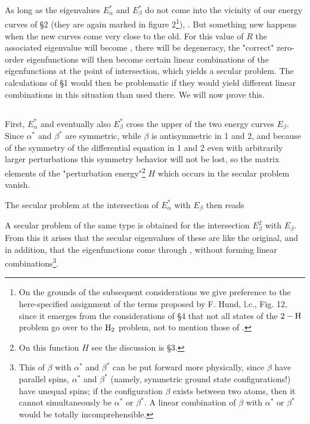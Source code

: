 \begin{paper}{1}
As long as the eigenvalues $E_\alpha^*$ and $E_\beta^*$ do not come into the vicinity of our energy curves of \S2 (they are again marked in figure 2\footnote{On the grounds of the subsequent considerations we give preference to the here-specified assignment of the terms proposed by F. Hund, l.c., Fig. 12, since it emerges from the considerations of \S4 that not all states of the $2-\text{H}$ problem go over to the $\text{H}_2$ problem, not to mention those of \He.}), . But something new happens when the new curves come very close to the old. For this value of $R$ the associated eigenvalue will become , there will be degeneracy, the "correct" zero-order eigenfunctions will then become certain linear combinations of the eigenfunctions at the point of intersection, which yields a secular problem. The calculations of \S1 would then be problematic if they would yield different linear combinations in this situation than used there. We will now prove this.

\subsection{} First, $E_\alpha^*$ and eventually also $E_\beta^*$ cross the upper of the two energy curves $E_\beta$. Since $\alpha^*$ and $\beta^*$ are symmetric, while $\beta$ is antisymmetric in 1 and 2, and because of the symmetry of the differential equation in 1 and 2 even with arbitrarily larger perturbations this symmetry behavior will not be lost, so the matrix elements of the "perturbation energy"\footnote{On this function $H$ see the discussion is \S3.} $H$ which occurs in the secular problem
vanish.

The secular problem at the intersection of $E_\alpha^*$ with $E_\beta$ then reads

A secular problem of the same type is obtained for the intersection $E_\beta^2$ with $E_\beta$. From this it arises that the secular eigenvalues of these are like the original, and in addition, that the eigenfunctions come through , without forming linear combinations\footnote{This  of $\beta$ with $\alpha^*$ and $\beta^*$ can be put forward more physically, since $\beta$ have parallel spins, $\alpha^*$ and $\beta^*$ (namely, symmetric \He ground state configurations!) have unequal spins; if the configuration $\beta$ exists between two atoms, then it cannot simultaneously be $\alpha^*$ or $\beta^*$. A linear combination of $\beta$ with $\alpha^*$ or $\beta^*$ would be totally incomprehensible.}.


\end{paper}
